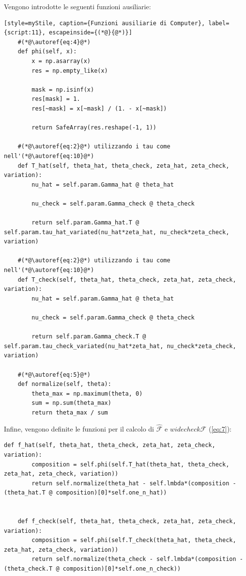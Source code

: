 Vengono introdotte le seguenti funzioni ausiliarie:

\begin{lstlisting}[style=myStile, caption={Funzioni ausiliarie di Computer}, label={script:11}, escapeinside={(*@}{@*)}]
    #(*@\autoref{eq:4}@*)
    def phi(self, x):
        x = np.asarray(x)
        res = np.empty_like(x)

        mask = np.isinf(x)
        res[mask] = 1.
        res[~mask] = x[~mask] / (1. - x[~mask])

        return SafeArray(res.reshape(-1, 1))
    
    #(*@\autoref{eq:2}@*) utilizzando i tau come nell'(*@\autoref{eq:10}@*)
    def T_hat(self, theta_hat, theta_check, zeta_hat, zeta_check, variation):
        nu_hat = self.param.Gamma_hat @ theta_hat

        nu_check = self.param.Gamma_check @ theta_check

        return self.param.Gamma_hat.T @ self.param.tau_hat_variated(nu_hat*zeta_hat, nu_check*zeta_check, variation)
    
    #(*@\autoref{eq:2}@*) utilizzando i tau come nell'(*@\autoref{eq:10}@*)
    def T_check(self, theta_hat, theta_check, zeta_hat, zeta_check, variation):
        nu_hat = self.param.Gamma_hat @ theta_hat

        nu_check = self.param.Gamma_check @ theta_check

        return self.param.Gamma_check.T @ self.param.tau_check_variated(nu_hat*zeta_hat, nu_check*zeta_check, variation)
    
    #(*@\autoref{eq:5}@*)
    def normalize(self, theta):
        theta_max = np.maximum(theta, 0)
        sum = np.sum(theta_max)
        return theta_max / sum
\end{lstlisting}

Infine, vengono definite le funzioni per il calcolo di $\widehat{\mathcal{F}}$ e $widecheck{\mathcal{F}}$ (\autoref{eq:7}):

\begin{lstlisting}[style=myStile, caption={Computer::f\_hat, Computer::f\_check}, label={script:12}]
    def f_hat(self, theta_hat, theta_check, zeta_hat, zeta_check, variation):
        composition = self.phi(self.T_hat(theta_hat, theta_check, zeta_hat, zeta_check, variation))
        return self.normalize(theta_hat - self.lmbda*(composition - (theta_hat.T @ composition)[0]*self.one_n_hat))
    
    
    def f_check(self, theta_hat, theta_check, zeta_hat, zeta_check, variation):
        composition = self.phi(self.T_check(theta_hat, theta_check, zeta_hat, zeta_check, variation))
        return self.normalize(theta_check - self.lmbda*(composition - (theta_check.T @ composition)[0]*self.one_n_check))
\end{lstlisting}